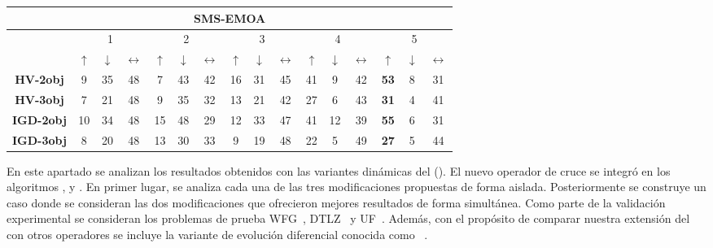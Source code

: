 \begin{table}[t]
\begin{scriptsize}
\begin{tabular}{|c|c|c|c|c|c|c|c|c|c|c|c|c|c|c|c|}
\hline
\hline
\multicolumn{16}{|c|}{SMS-EMOA} \\ \hline
 & \multicolumn{3}{c|}{1} & \multicolumn{3}{c|}{2} & \multicolumn{3}{c|}{3} & \multicolumn{3}{c|}{4} & \multicolumn{3}{c|}{5} \\ \hline
 & $\uparrow$ & $\downarrow$ & $\longleftrightarrow$ & $\uparrow$ & $\downarrow$ & $\longleftrightarrow$ & $\uparrow$ & $\downarrow$ & $\longleftrightarrow$ & $\uparrow$ & $\downarrow$ & $\longleftrightarrow$ & $\uparrow$ & $\downarrow$ & $\longleftrightarrow$ \\ \hline
\textbf{HV-2obj} & 9 & 35 & 48 & 7 & 43 & 42 & 16 & 31 & 45 & 41 & 9 & 42 & \textbf{53} & 8 & 31 \\ \hline
\textbf{HV-3obj} & 7 & 21 & 48 & 9 & 35 & 32 & 13 & 21 & 42 & 27 & 6 & 43 & \textbf{31} & 4 & 41 \\ \hline
\textbf{IGD-2obj} & 10 & 34 & 48 & 15 & 48 & 29 & 12 & 33 & 47 & 41 & 12 & 39 & \textbf{55} & 6 & 31 \\ \hline
\textbf{IGD-3obj} & 8 & 20 & 48 & 13 & 30 & 33 & 9 & 19 & 48 & 22 & 5 & 49 & \textbf{27} & 5 & 44 \\ \hline
\end{tabular}
\end{scriptsize}
\end{table}

En este apartado se analizan los resultados obtenidos con las variantes dinámicas del \SBX{} (\DSBX{}).
%
El nuevo operador de cruce se integró en los algoritmos \NSGAII{}, \MOEAD{} y \SMSEMOA{}.
%
En primer lugar, se analiza cada una de las tres modificaciones propuestas de forma aislada.
%
Posteriormente se construye un caso donde se consideran las dos modificaciones que ofrecieron mejores resultados de forma simultánea.
%
Como parte de la validación experimental se consideran los problemas de prueba WFG~\cite{Joel:WFG}, DTLZ~\cite{Joel:DTLZ_2} y UF~\cite{zhang2009performance}.
%
Además, con el propósito de comparar nuestra extensión del \SBX{} con otros operadores se incluye la variante de evolución diferencial conocida como \DEMO{}~\cite{tuvsar2007differential}.

